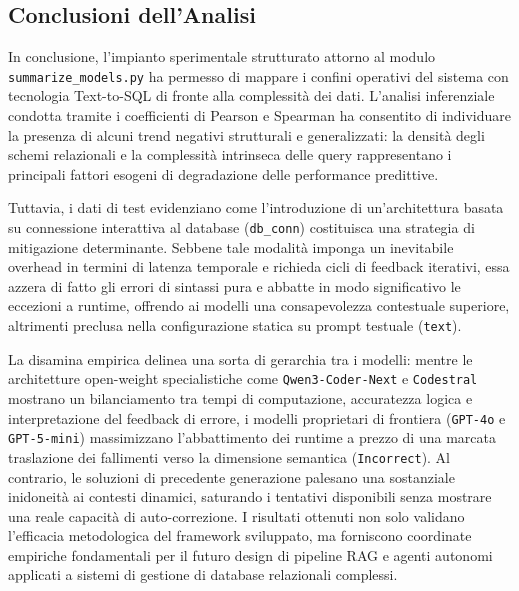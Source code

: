 \subsection{Conclusioni dell'Analisi}\label{conclusioni-dellanalisi}

In conclusione, l'impianto sperimentale strutturato attorno al modulo
\texttt{summarize\_models.py} ha permesso di mappare
i confini operativi del sistema con tecnologia Text-to-SQL di
fronte alla complessità dei dati. L'analisi inferenziale condotta
tramite i coefficienti di Pearson e Spearman ha consentito di individuare la presenza
di alcuni trend negativi strutturali e generalizzati: la densità degli
schemi relazionali e la complessità intrinseca delle query rappresentano
i principali fattori esogeni di degradazione delle performance
predittive.

Tuttavia, i dati di test evidenziano come l'introduzione di
un'architettura basata su connessione interattiva al database
(\texttt{db\_conn}) costituisca una strategia di mitigazione
determinante. Sebbene tale modalità imponga un inevitabile
overhead in termini di latenza temporale e richieda cicli di
feedback iterativi, essa azzera di fatto gli errori di sintassi pura e
abbatte in modo significativo le eccezioni a runtime, offrendo ai
modelli una consapevolezza contestuale superiore, altrimenti preclusa
nella configurazione statica su prompt testuale (\texttt{text}).

La disamina empirica delinea una sorta di gerarchia tra i
modelli: mentre le architetture open-weight specialistiche come
\texttt{Qwen3-Coder-Next} e \texttt{Codestral} mostrano un
bilanciamento tra tempi di computazione, accuratezza logica e
interpretazione del feedback di errore, i modelli proprietari di
frontiera (\texttt{GPT-4o} e \texttt{GPT-5-mini}) massimizzano
l'abbattimento dei runtime a prezzo di una marcata traslazione dei
fallimenti verso la dimensione semantica (\texttt{Incorrect}). Al
contrario, le soluzioni di precedente generazione palesano una
sostanziale inidoneità ai contesti dinamici, saturando i tentativi
disponibili senza mostrare una reale capacità di auto-correzione. I
risultati ottenuti non solo validano l'efficacia metodologica del
framework sviluppato, ma forniscono coordinate empiriche fondamentali
per il futuro design di pipeline RAG e agenti autonomi applicati
a sistemi di gestione di database relazionali complessi.

